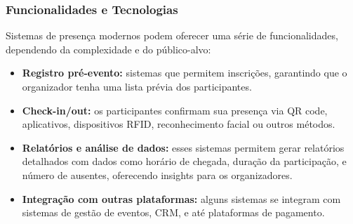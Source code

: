 \subsubsection{Funcionalidades e Tecnologias}
Sistemas de presença modernos podem oferecer uma série de funcionalidades, dependendo da complexidade e do público-alvo:

\begin{itemize}
    \item \textbf{Registro pré-evento:} sistemas que permitem inscrições, garantindo que o organizador tenha uma lista prévia dos participantes.
    \item \textbf{Check-in/out:} os participantes confirmam sua presença via QR code, aplicativos, dispositivos RFID, reconhecimento facial ou outros métodos.
    \item \textbf{Relatórios e análise de dados:} esses sistemas permitem gerar relatórios detalhados com dados como horário de chegada, duração da participação, e número de ausentes, oferecendo insights para os organizadores.
    \item \textbf{Integração com outras plataformas:} alguns sistemas se integram com sistemas de gestão de eventos, CRM, e até plataformas de pagamento.
\end{itemize}
